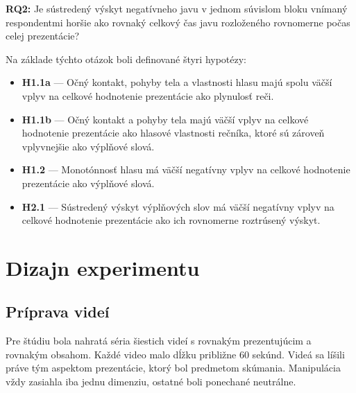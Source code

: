 \textbf{RQ2:} Je sústredený výskyt negatívneho javu v jednom súvislom bloku vnímaný respondentmi horšie ako rovnaký celkový čas javu rozloženého rovnomerne počas celej prezentácie?

Na základe týchto otázok boli definované štyri hypotézy:

\begin{itemize}
    \item \textbf{H1.1a} --- Očný kontakt, pohyby tela a vlastnosti hlasu majú spolu väčší vplyv na celkové hodnotenie prezentácie ako plynulosť reči.
    \item \textbf{H1.1b} --- Očný kontakt a pohyby tela majú väčší vplyv na celkové hodnotenie prezentácie ako hlasové vlastnosti rečníka, ktoré sú zároveň vplyvnejšie ako výplňové slová.
    \item \textbf{H1.2} --- Monotónnosť hlasu má väčší negatívny vplyv na celkové hodnotenie prezentácie ako výplňové slová.
    \item \textbf{H2.1} --- Sústredený výskyt výplňových slov má väčší negatívny vplyv na celkové hodnotenie prezentácie ako ich rovnomerne roztrúsený výskyt.
\end{itemize}

\section{Dizajn experimentu}

\subsection{Príprava videí}

Pre štúdiu bola nahratá séria šiestich videí s rovnakým prezentujúcim a rovnakým obsahom. Každé video malo dĺžku približne 60 sekúnd. Videá sa líšili práve tým aspektom prezentácie, ktorý bol predmetom skúmania. Manipulácia vždy zasiahla iba jednu dimenziu, ostatné boli ponechané neutrálne.

